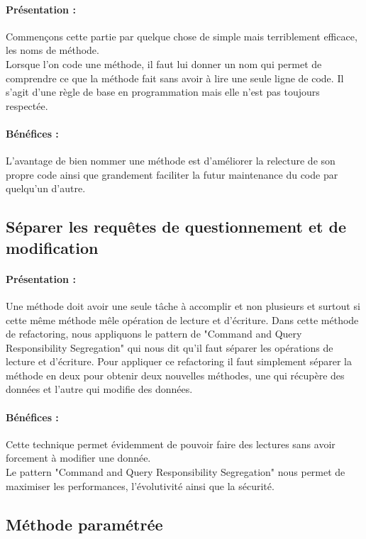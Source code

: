 \documentclass[a4paper,twoside,12pt,openright]{report}
\begin{document}
\paragraph{Présentation :}
Commençons cette partie par quelque chose de simple mais terriblement efficace, les noms de méthode.\\
Lorsque l'on code une méthode, il faut lui donner un nom qui permet de comprendre ce que la méthode fait sans avoir à lire une seule ligne de code. Il s'agit d'une règle de base en programmation mais elle n'est pas toujours respectée.

\paragraph{Bénéfices :}
L'avantage de bien nommer une méthode est d'améliorer la relecture de son propre code ainsi que grandement faciliter la futur maintenance du code par quelqu'un d'autre.\\

\subsection{Séparer les requêtes de questionnement et de modification}
\paragraph{Présentation :}
Une méthode doit avoir une seule tâche à accomplir et non plusieurs et surtout si cette même méthode mêle opération de lecture et d'écriture.
Dans cette méthode de refactoring, nous appliquons le pattern de "Command and Query Responsibility Segregation" qui nous dit qu'il faut séparer les opérations de lecture et d'écriture.
Pour appliquer ce refactoring il faut simplement séparer la méthode en deux pour obtenir deux nouvelles méthodes, une qui récupère des données et l'autre qui modifie des données.

\paragraph{Bénéfices :}
Cette technique permet évidemment de pouvoir faire des lectures sans avoir forcement à modifier une donnée.\\
Le pattern "Command and Query Responsibility Segregation" nous permet de maximiser les performances, l'évolutivité ainsi que la sécurité.\\

\subsection{Méthode paramétrée}
\end{document}

